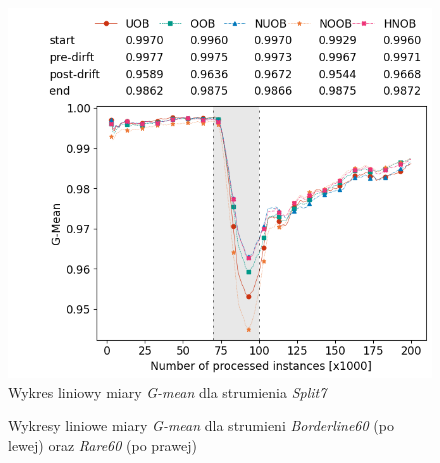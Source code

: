 \begin{figure}[h]
    \centering
    \includegraphics[width=13cm]{figures/split7_gmean.png}
    \caption{Wykres liniowy miary \textit{G-mean} dla strumienia \textit{Split7}}\label{Figure:Split7}
\end{figure}

\newpage

\begin{figure}[h]
    \centering
    \qquad
    \caption{Wykresy liniowe miary \textit{G-mean} dla strumieni \textit{Borderline60} (po lewej) oraz \textit{Rare60} (po prawej)}\label{Figure:BorderlineRareHNOB}
\end{figure}

